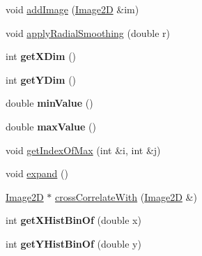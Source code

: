 \begin{DoxyCompactItemize}
\item 
void \hyperlink{classImage2D_a2db2c30389b3e52c8246295989e53755}{addImage} (\hyperlink{classImage2D}{Image2D} \&im)
\item 
\hypertarget{classImage2D_ab41e685b8dff0710d85ea51d9bd748c1}{
void \hyperlink{classImage2D_ab41e685b8dff0710d85ea51d9bd748c1}{applyRadialSmoothing} (double r)}
\label{classImage2D_ab41e685b8dff0710d85ea51d9bd748c1}

\item 
\hypertarget{classImage2D_aedea813aff3d0c8583ec9fed1660c3f0}{
int {\bfseries getXDim} ()}
\label{classImage2D_aedea813aff3d0c8583ec9fed1660c3f0}

\item 
\hypertarget{classImage2D_a56e8c4066142765cefbae500b32b7ec5}{
int {\bfseries getYDim} ()}
\label{classImage2D_a56e8c4066142765cefbae500b32b7ec5}

\item 
\hypertarget{classImage2D_a30ac7fec10d7cca8e57ded1023f9134d}{
double {\bfseries minValue} ()}
\label{classImage2D_a30ac7fec10d7cca8e57ded1023f9134d}

\item 
\hypertarget{classImage2D_ab4831e847a315849ce29b16b579f1be0}{
double {\bfseries maxValue} ()}
\label{classImage2D_ab4831e847a315849ce29b16b579f1be0}

\item 
\hypertarget{classImage2D_ad61b4f34f9750c50b1f52c9905ec4127}{
void \hyperlink{classImage2D_ad61b4f34f9750c50b1f52c9905ec4127}{getIndexOfMax} (int \&i, int \&j)}
\label{classImage2D_ad61b4f34f9750c50b1f52c9905ec4127}

\item 
\hypertarget{classImage2D_a7b9b44ca053ab7c6ceac862409c101df}{
void \hyperlink{classImage2D_a7b9b44ca053ab7c6ceac862409c101df}{expand} ()}
\label{classImage2D_a7b9b44ca053ab7c6ceac862409c101df}

\item 
\hyperlink{classImage2D}{Image2D} $\ast$ \hyperlink{classImage2D_ac0bf085a54600d658f594cadb5069691}{crossCorrelateWith} (\hyperlink{classImage2D}{Image2D} \&)
\item 
\hypertarget{classImage2D_a8106dc5bd861ce8086d9cef69165d282}{
int {\bfseries getXHistBinOf} (double x)}
\label{classImage2D_a8106dc5bd861ce8086d9cef69165d282}

\item 
\hypertarget{classImage2D_a88624daa79e7a7f9ae674b6b880df08b}{
int {\bfseries getYHistBinOf} (double y)}
\label{classImage2D_a88624daa79e7a7f9ae674b6b880df08b}

\end{DoxyCompactItemize}


